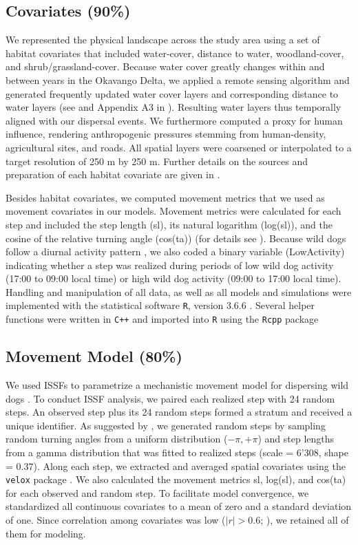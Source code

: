 \documentclass[abstract=on,10pt,a4paper,bibliography=totocnumbered]{article}
\begin{document}
\subsection{Covariates (90\%)}
We represented the physical landscape across the study area using a set of
habitat covariates that included water-cover, distance to water, woodland-cover,
and shrub/grassland-cover. Because water cover greatly changes within and
between years in the Okavango Delta, we applied a remote sensing algorithm and
generated frequently updated water cover layers and corresponding distance to
water layers (see \citealp{Wolski.2017} and Appendix A3 in
\citealp{Hofmann.2021}). Resulting water layers thus temporally aligned with our
dispersal events. We furthermore computed a proxy for human influence, rendering
anthropogenic pressures stemming from human-density, agricultural sites, and
roads. All spatial layers were coarsened or interpolated to a target resolution
of 250 m by 250 m. Further details on the sources and preparation of each
habitat covariate are given in \cite{Hofmann.2021}.

Besides habitat covariates, we computed movement metrics that we used as
movement covariates in our models. Movement metrics were calculated for each
step and included the step length (\textsf{sl}), its natural logarithm
(\textsf{log(sl)}), and the cosine of the relative turning angle
(\textsf{cos(ta)}) (for details see \citep{Avgar.2016, Fieberg.2020}). Because
wild dogs follow a diurnal activity pattern \citep{Castello.2018}, we also coded
a binary variable (\textsf{LowActivity}) indicating whether a step was realized
during periods of low wild dog activity (17:00 to 09:00 local time) or high wild
dog activity (09:00 to 17:00 local time). Handling and manipulation of all data,
as well as all models and simulations were implemented with the statistical
software {\tt R}, version 3.6.6 \citep{R.2019}. Several helper functions were
written in {\tt C++} and imported into {\tt R} using the {\tt Rcpp} package
\citep{Eddelbuettel.2011, Eddelbuettel.2013}

\subsection{Movement Model (80\%)}
We used ISSFs to parametrize a mechanistic movement model for dispersing wild
dogs \citep{Avgar.2016}. To conduct ISSF analysis, we paired each realized step
with 24 random steps. An observed step plus its 24 random steps formed a stratum
and received a unique identifier. As suggested by \cite{Avgar.2016}, we
generated random steps by sampling random turning angles from a uniform
distribution (\(-\pi, +\pi\)) and step lengths from a gamma distribution that
was fitted to realized steps (scale = 6'308, shape = 0.37). Along each step, we
extracted and averaged spatial covariates using the {\tt velox} package
\citep{Hunziker.2021}. We also calculated the movement metrics \textsf{sl},
\textsf{log(sl)}, and \textsf{cos(ta)} for each observed and random step. To
facilitate model convergence, we standardized all continuous covariates to a
mean of zero and a standard deviation of one. Since correlation among covariates
was low (\(|r| > 0.6\); \citealp{Latham.2011}), we retained all of them for
modeling.
\end{document}
